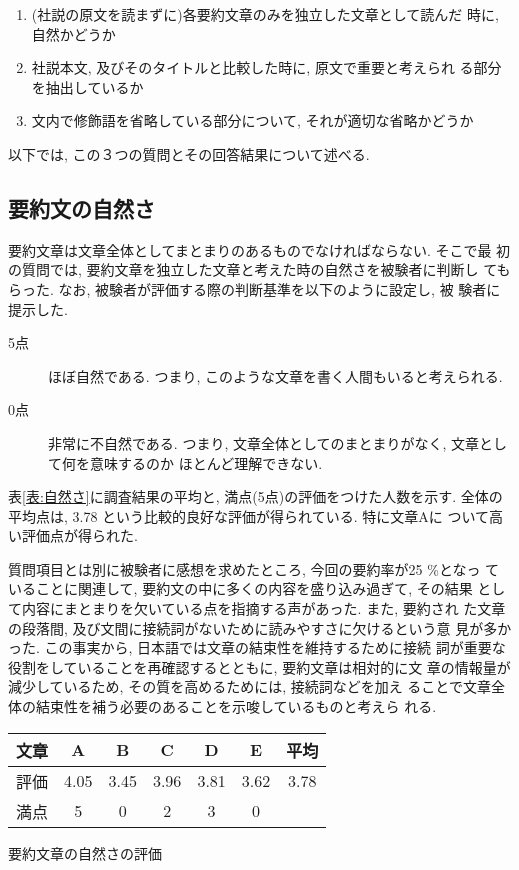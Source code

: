 \begin{enumerate}
\item (社説の原文を読まずに)各要約文章のみを独立した文章として読んだ
時に, 自然かどうか
\item 社説本文, 及びそのタイトルと比較した時に, 原文で重要と考えられ
る部分を抽出しているか
\item 文内で修飾語を省略している部分について, それが適切な省略かどうか
\end{enumerate}

以下では, この３つの質問とその回答結果について述べる. 

\subsection{要約文の自然さ}
要約文章は文章全体としてまとまりのあるものでなければならない. そこで最
初の質問では, 要約文章を独立した文章と考えた時の自然さを被験者に判断し
てもらった. なお, 被験者が評価する際の判断基準を以下のように設定し, 被
験者に提示した. 

\begin{description}
\item[5点]ほぼ自然である. 
つまり, このような文章を書く人間もいると考えられる. 
\item[0点]非常に不自然である. 
つまり, 文章全体としてのまとまりがなく, 文章として何を意味するのか
ほとんど理解できない. 
\end{description}

表\ref{表:自然さ}に調査結果の平均と, 満点(5点)の評価をつけた人数を示す. 
全体の平均点は, 3.78 という比較的良好な評価が得られている. 特に文章Aに
ついて高い評価点が得られた. 

質問項目とは別に被験者に感想を求めたところ, 今回の要約率が25 \%となっ
ていることに関連して, 要約文の中に多くの内容を盛り込み過ぎて, その結果
として内容にまとまりを欠いている点を指摘する声があった. また, 要約され
た文章の段落間, 及び文間に接続詞がないために読みやすさに欠けるという意
見が多かった. この事実から, 日本語では文章の結束性を維持するために接続
詞が重要な役割をしていることを再確認するとともに, \vspace*{-0.1mm}要約文章は相対的に文
章の情報量が減少しているため, その質を高めるためには, \vspace*{-0.1mm}接続詞などを加え
ることで文章全体の結束性を補う必要のあることを示唆しているものと考えら
れる. \vspace*{-0.1mm}

\begin{center}
\begin{tabular}{|c||c|c|c|c|c||c|}
\hline
文章 & A & B & C & D & E & 平均 \\
\hline
評価 & 4.05 & 3.45 & 3.96 & 3.81 & 3.62 & 3.78 \\
満点 & 5 & 0 & 2 & 3 & 0 & \\
\hline
\end{tabular}
\caption{要約文章の自然さの評価}
\label{表:自然さ}
\vspace*{-0.2mm}
\end{center}



